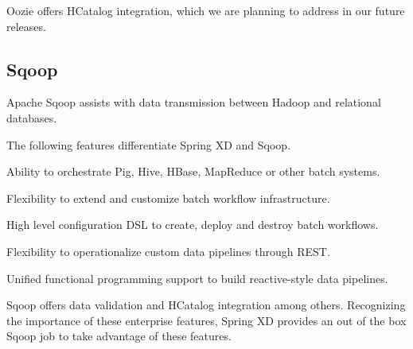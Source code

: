 Oozie offers HCatalog integration, which we are planning to address in our
future releases.

\subsection{Sqoop}
Apache Sqoop\cite{sqoop} assists with data transmission between Hadoop and relational
databases.

The following features differentiate Spring XD and Sqoop.

\begin{itemize*}
\item Ability to orchestrate Pig, Hive, HBase, MapReduce or other batch systems.
\item Flexibility to extend and customize batch workflow infrastructure.
\item High level configuration DSL to create, deploy and destroy batch workflows.
\item Flexibility to operationalize custom data pipelines through REST.
\item Unified functional programming support to build reactive-style data pipelines.
\end{itemize*}

Sqoop offers data validation and HCatalog integration among others. Recognizing the
importance of these enterprise features, Spring XD provides an out of the box Sqoop
job to take advantage of these features.
